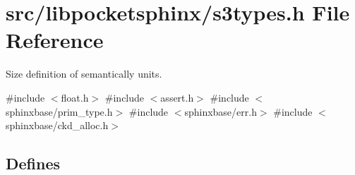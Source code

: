 \section{src/libpocketsphinx/s3types.h \-File \-Reference}
\label{s3types_8h}


\-Size definition of semantically units.  


{\ttfamily \#include $<$float.\-h$>$}\*
{\ttfamily \#include $<$assert.\-h$>$}\*
{\ttfamily \#include $<$sphinxbase/prim\-\_\-type.\-h$>$}\*
{\ttfamily \#include $<$sphinxbase/err.\-h$>$}\*
{\ttfamily \#include $<$sphinxbase/ckd\-\_\-alloc.\-h$>$}\*
\subsection*{\-Defines}
